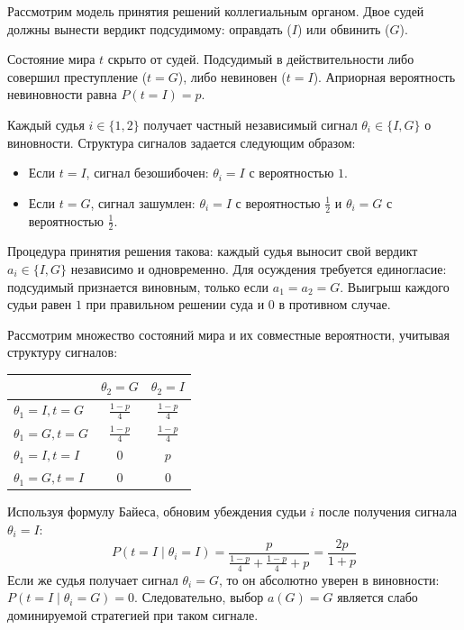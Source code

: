 Рассмотрим модель принятия решений коллегиальным органом. Двое судей должны вынести вердикт подсудимому: оправдать ($I$) или обвинить ($G$).

Состояние мира $t$ скрыто от судей. Подсудимый в действительности либо совершил преступление ($t = G$), либо невиновен ($t = I$). Априорная вероятность невиновности равна $P(t = I) = p$.

Каждый судья $i \in \{1, 2\}$ получает частный независимый сигнал $\theta_i \in \{I, G\}$ о виновности. Структура сигналов задается следующим образом:
\begin{itemize}
    \item Если $t = I$, сигнал безошибочен: $\theta_i = I$ с вероятностью $1$.
    \item Если $t = G$, сигнал зашумлен: $\theta_i = I$ с вероятностью $\frac{1}{2}$ и $\theta_i = G$ с вероятностью $\frac{1}{2}$.
\end{itemize}

Процедура принятия решения такова: каждый судья выносит свой вердикт $a_i \in \{I, G\}$ независимо и одновременно. Для осуждения требуется единогласие: подсудимый признается виновным, только если $a_1 = a_2 = G$. Выигрыш каждого судьи равен $1$ при правильном решении суда и $0$ в противном случае. 

Рассмотрим множество состояний мира и их совместные вероятности, учитывая структуру сигналов:
\begin{table}[h]
\centering
\renewcommand{\arraystretch}{1.5}
\begin{NiceTabular}{l|cc}
\toprule
 & $\theta_2 = G$ & $\theta_2 = I$ \\
\midrule
$\theta_1 = I, t = G$ & $\frac{1-p}{4}$ & $\frac{1-p}{4}$ \\
$\theta_1 = G, t = G$ & $\frac{1-p}{4}$ & $\frac{1-p}{4}$ \\
$\theta_1 = I, t = I$ & $0$ & $p$ \\
$\theta_1 = G, t = I$ & $0$ & $0$ \\
\bottomrule
\end{NiceTabular}
\end{table}

Используя формулу Байеса, обновим убеждения судьи $i$ после получения сигнала $\theta_i = I$:
\begin{equation}
P(t = I \mid \theta_i = I) = \frac{p}{\frac{1-p}{4} + \frac{1-p}{4} + p} = \frac{2p}{1 + p}
\end{equation}
Если же судья получает сигнал $\theta_i = G$, то он абсолютно уверен в виновности: $P(t = I \mid \theta_i = G) = 0$. Следовательно, выбор $a(G) = G$ является слабо доминируемой стратегией при таком сигнале.

